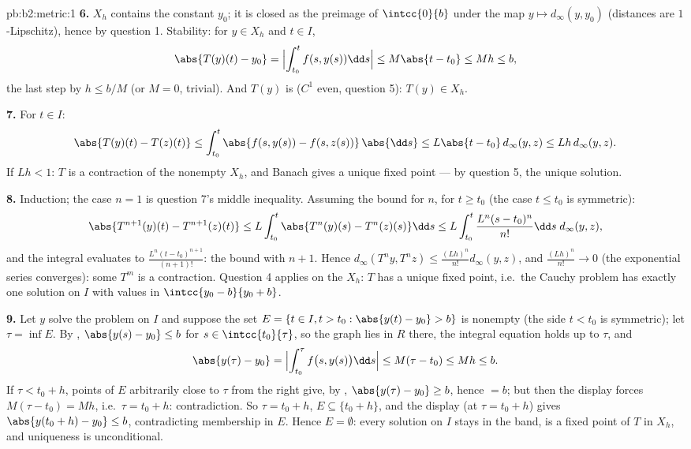 \begin{solution}{pb:b2:metric:1}
\textbf{6.} $X_h$ contains the constant $y_0$; it is closed as
the preimage of $\intcc{0}{b}$ under the  map $y
\mapsto d_\infty(y, y_0)$ (distances are $1$-Lipschitz), hence
 by question 1. Stability: for $y \in X_h$ and $t \in
I$,
\[
\abs{T(y)(t) - y_0} = \Bigl|\int_{t_0}^{t}f(s, y(s))\dd s\Bigr|
\leq M\abs{t - t_0} \leq Mh \leq b ,
\]
the last step by $h \leq b/M$ (or $M = 0$, trivial). And $T(y)$
is  ($C^1$ even, question 5): $T(y) \in X_h$.

\textbf{7.} For $t \in I$:
\[
\abs{T(y)(t) - T(z)(t)} \leq \int_{t_0}^{t}\abs{f(s, y(s)) -
f(s, z(s))}\,\abs{\dd s} \leq L\abs{t - t_0}\,d_\infty(y,z)
\leq Lh\,d_\infty(y,z).
\]
If $Lh < 1$: $T$ is a contraction of the nonempty 
$X_h$, and Banach gives a unique fixed point --- by question 5,
the unique solution.

\textbf{8.} Induction; the case $n = 1$ is question 7's middle
inequality. Assuming the bound for $n$, for $t \geq t_0$ (the
case $t \leq t_0$ is symmetric):
\[
\abs{T^{n+1}(y)(t) - T^{n+1}(z)(t)}
\leq L\int_{t_0}^{t}\abs{T^n(y)(s) - T^n(z)(s)}\dd s
\leq L\int_{t_0}^{t}\frac{L^n(s - t_0)^n}{n!}\dd s\;
d_\infty(y,z),
\]
and the integral evaluates to $\frac{L^n(t -
t_0)^{n+1}}{(n+1)!}$: the bound with $n + 1$. Hence
$d_\infty(T^n y, T^n z) \leq \frac{(Lh)^n}{n!}d_\infty(y, z)$,
and $\frac{(Lh)^n}{n!} \to 0$ (the exponential series
converges): some $T^m$ is a contraction. Question 4 applies on
the  $X_h$: $T$ has a unique fixed point, i.e.\ the
Cauchy problem has exactly one solution on $I$ with values in
$\intcc{y_0 - b}{y_0 + b}$.

\textbf{9.} Let $y$ solve the problem on $I$ and suppose the set
$E = \{t \in I, t > t_0 : \abs{y(t) - y_0} > b\}$ is nonempty
(the side $t < t_0$ is symmetric); let $\tau = \inf E$. By
, $\abs{y(s) - y_0} \leq b$ for $s \in
\intcc{t_0}{\tau}$, so the graph lies in $R$ there, the integral
equation holds up to $\tau$, and
\[
\abs{y(\tau) - y_0} = \Bigl|\int_{t_0}^{\tau}f\bigl(s,
y(s)\bigr)\dd s\Bigr| \leq M(\tau - t_0) \leq Mh \leq b .
\]
If $\tau < t_0 + h$, points of $E$ arbitrarily close to $\tau$
from the right give, by , $\abs{y(\tau) - y_0} \geq
b$, hence $= b$; but then the display forces $M(\tau - t_0) =
Mh$, i.e.\ $\tau = t_0 + h$: contradiction. So $\tau = t_0 + h$,
$E \subseteq \{t_0 + h\}$, and the display (at $\tau = t_0 + h$)
gives $\abs{y(t_0 + h) - y_0} \leq b$, contradicting membership
in $E$. Hence $E = \emptyset$: every solution on $I$ stays in
the band, is a fixed point of $T$ in $X_h$, and uniqueness is
unconditional.


\end{solution}
